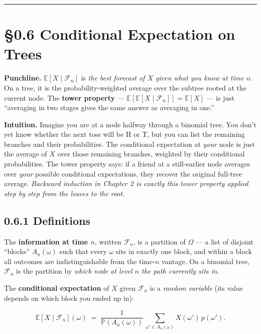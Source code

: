 \documentclass[
  10pt,
  twoside]{book}
\begin{document}
\begin{center}\rule{0.5\linewidth}{0.5pt}\end{center}

\section{§0.6 Conditional Expectation on
Trees}\label{conditional-expectation-on-trees}

\textbf{Punchline.} \(\mathbb{E}[X \mid \mathcal{F}_n]\) is \emph{the
best forecast of \(X\) given what you know at time \(n\)}. On a tree, it
is the probability-weighted average over the subtree rooted at the
current node. The \textbf{tower property} ---
\(\mathbb{E}[\mathbb{E}[X \mid \mathcal{F}_n]] = \mathbb{E}[X]\) --- is
just ``averaging in two stages gives the same answer as averaging in
one.''

\textbf{Intuition.} Imagine you are at a node halfway through a binomial
tree. You don't yet know whether the next toss will be H or T, but you
can list the remaining branches and their probabilities. The conditional
expectation at \emph{your} node is just the average of \(X\) over those
remaining branches, weighted by their conditional probabilities. The
tower property says: if a friend at a still-earlier node averages over
\emph{your} possible conditional expectations, they recover the original
full-tree average. \emph{Backward induction in Chapter 2 is exactly this
tower property applied step by step from the leaves to the root.}

\subsection{0.6.1 Definitions}\label{definitions-3}

The \textbf{information at time \(n\)}, written \(\mathcal{F}_n\), is a
partition of \(\Omega\) --- a list of disjoint ``blocks''
\(A_n(\omega)\) such that every \(\omega\) sits in exactly one block,
and within a block all outcomes are indistinguishable from the
time-\(n\) vantage. On a binomial tree, \(\mathcal{F}_n\) is the
partition by \emph{which node at level \(n\) the path currently sits
in}.

The \textbf{conditional expectation} of \(X\) given \(\mathcal{F}_n\) is
a \emph{random variable} (its value depends on which block you ended up
in):

\[\mathbb{E}[X \mid \mathcal{F}_n](\omega) \;=\; \frac{1}{\mathbb{P}(A_n(\omega))}\,\sum_{\omega' \in A_n(\omega)} X(\omega')\,p(\omega').\]
\end{document}
